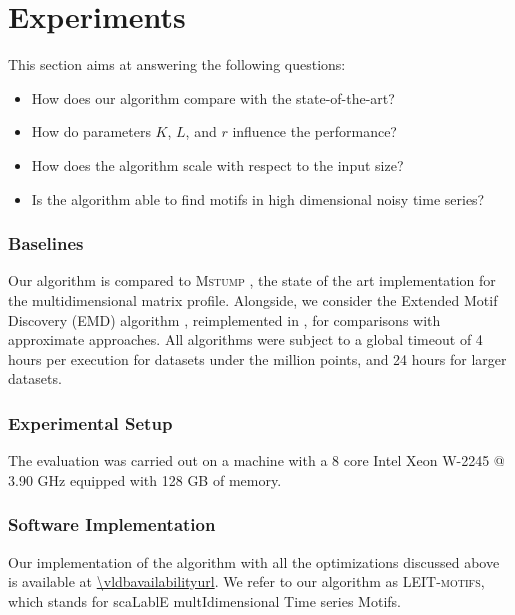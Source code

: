 \section{Experiments}
\label{sec:exp}
This section aims at answering the following questions:
\begin{itemize}
    \item How does our algorithm compare with the state-of-the-art?
    \item How do parameters $K$, $L$, and $r$ influence the performance?
    \item How does the algorithm scale with respect to the input size?
    \item Is the algorithm able to find motifs in high dimensional noisy time series?
\end{itemize}
\subsubsection*{Baselines}
Our algorithm is compared to \textsc{Mstump} \cite{Law2019}, the state of the art implementation for the multidimensional matrix profile. Alongside, we consider the Extended Motif Discovery (\textsc{EMD}) algorithm \cite{tanaka2005discovery}, reimplemented in \cite{emdsilva}, for comparisons with approximate approaches.
All algorithms were subject to a global timeout of 4 hours per execution for datasets under the million points, and 24 hours for larger datasets.
\subsubsection*{Experimental Setup}
The evaluation was carried out on a machine with a 8 core Intel Xeon W-2245 @ 3.90 GHz equipped with 128 GB of memory.
\subsubsection*{Software Implementation}
Our implementation of the algorithm with all the optimizations discussed above is available at \url{\vldbavailabilityurl}. We refer to our algorithm as \textsc{LEIT-motifs}, which stands for scaLablE multIdimensional Time series Motifs.
